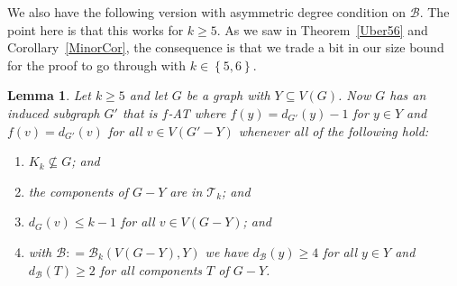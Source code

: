 \documentclass[12pt]{article}
\theoremstyle{plain}
\newtheorem{lem}[thm]{Lemma}
\theoremstyle{definition}
\theoremstyle{remark}
\newcommand{\fancy}[1]{\mathcal{#1}}
\newcommand{\T}{\fancy{T}}
\newcommand{\B}{\fancy{B}}
\newcommand{\set}[1]{\left\{ #1 \right\}}
\newcommand{\DefinedAs}{\mathrel{\mathop:}=}
\begin{document}
We also have the following version with asymmetric degree condition on $\B$. 
The point here is that this works for $k \ge 5$.  As we saw in
Theorem~\ref{Uber56} and Corollary~\ref{MinorCor}, the consequence is that we
trade a bit in our size bound for the proof to go through with $k \in
\set{5,6}$.

\begin{lem}
\label{MultipleHighConfigurationEulerLopsided} 
Let $k \ge 5$ and let $G$ be a graph with $Y\subseteq V(G)$.  Now $G$ has an induced
subgraph $G'$ that is $f$-AT where $f(y)=d_{G'}(y)-1$ for $y\in Y$ and
$f(v)=d_{G'}(v)$ for all $v\in V(G'-Y)$ whenever all of the following hold:
	\begin{enumerate}
		\item $K_{k}\not\subseteq G$; and 
		\item the components of $G-Y$ are in $\T_{k}$; and 
		\item $d_{G}(v)\leq k-1$ for all $v\in V(G-Y)$; and 
		\item with $\B \DefinedAs \B_k(V(G-Y), Y)$ we have $d_{\B}(y) \ge 4$ for all $y \in Y$ and $d_{\B}(T) \ge 2$ for all components $T$ of $G-Y$.
	\end{enumerate}
\end{lem}





\end{document}
